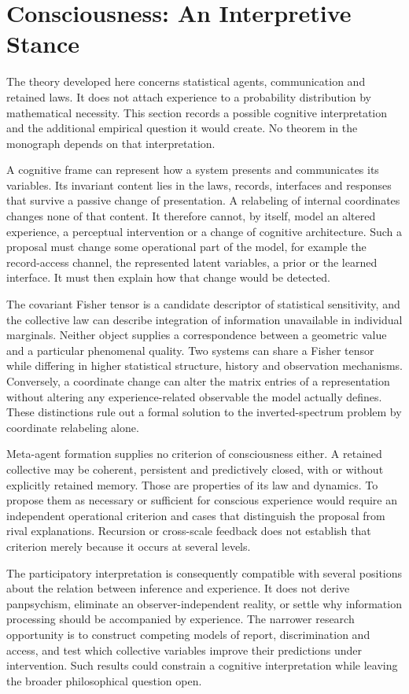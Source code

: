 \section{Consciousness: An Interpretive Stance}\label{sec:consciousness}

The theory developed here concerns statistical agents, communication and retained laws. It does not attach experience to a probability distribution by mathematical necessity. This section records a possible cognitive interpretation and the additional empirical question it would create. No theorem in the monograph depends on that interpretation.

A cognitive frame can represent how a system presents and communicates its variables. Its invariant content lies in the laws, records, interfaces and responses that survive a passive change of presentation. A relabeling of internal coordinates changes none of that content. It therefore cannot, by itself, model an altered experience, a perceptual intervention or a change of cognitive architecture. Such a proposal must change some operational part of the model, for example the record-access channel, the represented latent variables, a prior or the learned interface. It must then explain how that change would be detected.

The covariant Fisher tensor is a candidate descriptor of statistical sensitivity, and the collective law can describe integration of information unavailable in individual marginals. Neither object supplies a correspondence between a geometric value and a particular phenomenal quality. Two systems can share a Fisher tensor while differing in higher statistical structure, history and observation mechanisms. Conversely, a coordinate change can alter the matrix entries of a representation without altering any experience-related observable the model actually defines. These distinctions rule out a formal solution to the inverted-spectrum problem by coordinate relabeling alone.

Meta-agent formation supplies no criterion of consciousness either. A retained collective may be coherent, persistent and predictively closed, with or without explicitly retained memory. Those are properties of its law and dynamics. To propose them as necessary or sufficient for conscious experience would require an independent operational criterion and cases that distinguish the proposal from rival explanations. Recursion or cross-scale feedback does not establish that criterion merely because it occurs at several levels.

The participatory interpretation is consequently compatible with several positions about the relation between inference and experience. It does not derive panpsychism, eliminate an observer-independent reality, or settle why information processing should be accompanied by experience. The narrower research opportunity is to construct competing models of report, discrimination and access, and test which collective variables improve their predictions under intervention. Such results could constrain a cognitive interpretation while leaving the broader philosophical question open.
